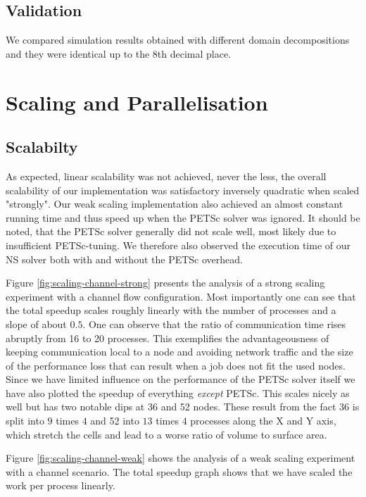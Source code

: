 \documentclass[11pt,a4paper]{article}
\begin{document}
\subsection{Validation}

We compared simulation results obtained with different domain decompositions and
they were identical up to the 8th decimal place.

\section{Scaling and Parallelisation}
\subsection{Scalabilty}

As expected, linear scalability was not achieved, never the less, the overall
scalability of our implementation was satisfactory inversely quadratic when
scaled "strongly". Our weak scaling implementation also achieved an almost
constant running time and thus speed up when the PETSc solver was ignored. It
should be noted, that the PETSc solver generally did not scale well, most likely
due to insufficient PETSc-tuning. We therefore also observed the execution time
of our NS solver both with and without the PETSc overhead.

Figure \ref{fig:scaling-channel-strong} presents the analysis of a strong
scaling experiment with a channel flow configuration. Most importantly one can
see that the total speedup scales roughly linearly with the number of processes
and a slope of about $0.5$. One can observe that the ratio of communication time
rises abruptly from 16 to 20 processes. This exemplifies the advantageousness of
keeping communication local to a node and avoiding network traffic and the size
of the performance loss that can result when a job does not fit the used
nodes. Since we have limited influence on the performance of the PETSc solver
itself we have also plotted the speedup of everything \emph{except} PETSc. This
scales nicely as well but has two notable dips at 36 and 52 nodes. These result
from the fact 36 is split into $9$ times $4$ and 52 into $13$ times $4$
processes along the X and Y axis, which stretch the cells and lead to a worse
ratio of volume to surface area.

Figure \ref{fig:scaling-channel-weak} shows the analysis of a weak scaling
experiment with a channel scenario. The total speedup graph shows that we have
scaled the work per process linearly.
\end{document}

